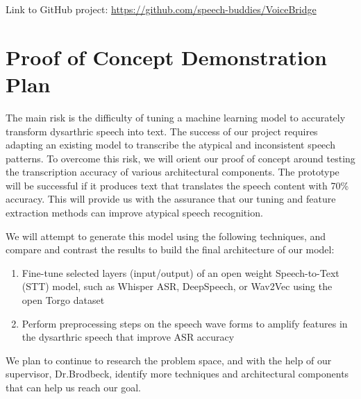 \documentclass{article}
\begin{document}
Link to GitHub project: \url{https://github.com/speech-buddies/VoiceBridge}

\section{Proof of Concept Demonstration Plan}


The main risk is the difficulty of tuning a machine learning model to accurately transform dysarthric speech into text. The success of our project requires adapting an existing model to transcribe the atypical and inconsistent speech patterns. To overcome this risk, we will orient our proof of concept around testing the transcription accuracy of various architectural components. The prototype will be successful if it produces text that translates the speech content with 70\% accuracy. This will provide us with the assurance that our tuning and feature extraction methods can improve atypical speech recognition.

We will attempt to generate this model using the following techniques, and compare and contrast the results to build the final architecture of our model:
\begin{enumerate}
    \item Fine-tune selected layers (input/output) of an open weight Speech-to-Text (STT) model, such as Whisper ASR, DeepSpeech, or Wav2Vec using the open Torgo dataset
    \item Perform preprocessing steps on the speech wave forms to amplify features in the dysarthric speech that improve ASR accuracy 
\end{enumerate}


We plan to continue to research the problem space, and with the help of our supervisor, Dr.Brodbeck, identify more techniques and architectural components that can help us reach our goal.
\end{document}
